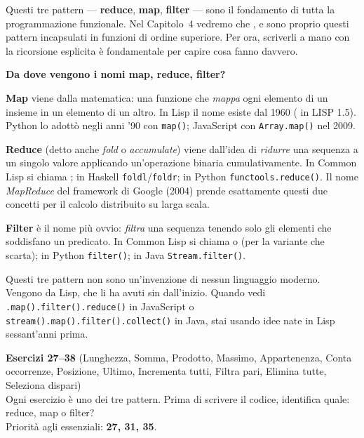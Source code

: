 \begin{intuizione}
Questi tre pattern — \textbf{reduce}, \textbf{map}, \textbf{filter} —
sono il fondamento di tutta la programmazione funzionale.
Nel Capitolo~4 vedremo che ,  e 
sono proprio questi pattern incapsulati in funzioni di ordine superiore.
Per ora, scriverli a mano con la ricorsione esplicita è fondamentale
per capire cosa fanno davvero.
\end{intuizione}

\begin{confronto}
\textbf{Da dove vengono i nomi map, reduce, filter?}

\medskip
\textbf{Map} viene dalla matematica: una funzione che \emph{mappa} ogni
elemento di un insieme in un elemento di un altro.
In Lisp il nome esiste dal 1960 ( in LISP 1.5).
Python lo adottò negli anni '90 con \texttt{map()};
JavaScript con \texttt{Array.map()} nel 2009.

\medskip
\textbf{Reduce} (detto anche \emph{fold} o \emph{accumulate}) viene
dall'idea di \emph{ridurre} una sequenza a un singolo valore applicando
un'operazione binaria cumulativamente.
In Common Lisp si chiama ; in Haskell \texttt{foldl}/\texttt{foldr};
in Python \texttt{functools.reduce()}.
Il nome \emph{MapReduce} del framework di Google (2004) prende esattamente
questi due concetti per il calcolo distribuito su larga scala.

\medskip
\textbf{Filter} è il nome più ovvio: \emph{filtra} una sequenza tenendo
solo gli elementi che soddisfano un predicato.
In Common Lisp si chiama  o 
(per la variante che scarta); in Python \texttt{filter()};
in Java \texttt{Stream.filter()}.

\medskip
Questi tre pattern non sono un'invenzione di nessun linguaggio moderno.
Vengono da Lisp, che li ha avuti sin dall'inizio.
Quando vedi \texttt{.map().filter().reduce()} in JavaScript o
\texttt{stream().map().filter().collect()} in Java, stai usando
idee nate in Lisp sessant'anni prima.
\end{confronto}

\begin{workbook}
\textbf{Esercizi 27--38}
(Lunghezza, Somma, Prodotto, Massimo, Appartenenza, Conta occorrenze,
Posizione, Ultimo, Incrementa tutti, Filtra pari, Elimina tutte, Seleziona dispari)\\[4pt]
Ogni esercizio è uno dei tre pattern. Prima di scrivere il codice,
identifica quale: reduce, map o filter?\\[4pt]
Priorità agli essenziali: \textbf{27, 31, 35}.
\end{workbook}

